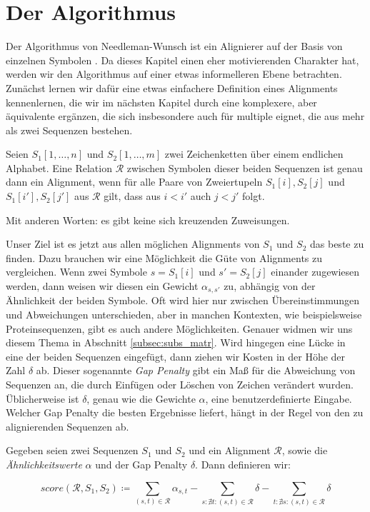 \section{Der Algorithmus}

Der Algorithmus von Needleman-Wunsch ist ein Alignierer auf der Basis von einzelnen Symbolen \cite{nw70}. Da dieses Kapitel einen eher motivierenden Charakter hat, werden wir den Algorithmus auf einer etwas informelleren Ebene betrachten. Zunächst lernen wir dafür eine etwas einfachere Definition eines Alignments kennenlernen, die wir im nächsten Kapitel durch eine komplexere, aber äquivalente ergänzen, die sich insbesondere auch für multiple eignet, die aus mehr als zwei Sequenzen bestehen.

\begin{definition}
	Seien $S_1[1,\dots, n]$ und $S_2[1,\dots,m]$ zwei Zeichenketten über einem endlichen Alphabet. Eine Relation $\mathcal{R}$ zwischen Symbolen dieser beiden Sequenzen ist genau dann ein Alignment, wenn für alle Paare von Zweiertupeln $S_1[i],S_2[j]$ und $S_1[i'],S_2[j']$ aus $\mathcal{R}$ gilt, dass aus $i < i'$ auch $j < j'$ folgt. 
	
	\noindent Mit anderen Worten: es gibt keine sich kreuzenden Zuweisungen.
\end{definition}

Unser Ziel ist es jetzt aus allen möglichen Alignments von $S_1$ und $S_2$ das beste zu finden. Dazu brauchen wir eine Möglichkeit die Güte von Alignments zu vergleichen. Wenn zwei Symbole $s = S_1[i]$ und $s' = S_2[j]$ einander zugewiesen werden, dann weisen wir diesen ein Gewicht $\alpha_{s,s'}$ zu, abhängig von der Ähnlichkeit der beiden Symbole. Oft wird hier nur zwischen Übereinstimmungen und Abweichungen unterschieden, aber in manchen Kontexten, wie beispielsweise Proteinsequenzen, gibt es auch andere Möglichkeiten. Genauer widmen wir uns diesem Thema in Abschnitt \ref{subsec:subs_matr}. Wird hingegen eine Lücke in eine der beiden Sequenzen eingefügt, dann ziehen wir Kosten in der Höhe der Zahl $\delta$ ab. Dieser sogenannte \emph{Gap Penalty} gibt ein Maß für die Abweichung von Sequenzen an, die durch Einfügen oder Löschen von Zeichen verändert wurden. Üblicherweise ist $\delta$, genau wie die Gewichte $\alpha$, eine benutzerdefinierte Eingabe. Welcher Gap Penalty die besten Ergebnisse liefert, hängt in der Regel von den zu alignierenden Sequenzen ab.

\begin{definition}
	Gegeben seien zwei Sequenzen $S_1$ und $S_2$ und ein Alignment $\mathcal{R}$, sowie die \emph{Ähnlichkeitswerte} $\alpha$ und  der Gap Penalty $\delta$. Dann definieren wir:
	
	\begin{equation*}
	\mathit{score}(\mathcal{R},S_1,S_2) \coloneqq \sum_{(s,t)\in \mathcal{R}}{\alpha_{s,t}} - \sum_{s : \nexists t : (s,t)\in \mathcal{R}}{\delta} - \sum_{t : \nexists s : (s,t)\in \mathcal{R}}{\delta}
	\end{equation*}
\end{definition}

